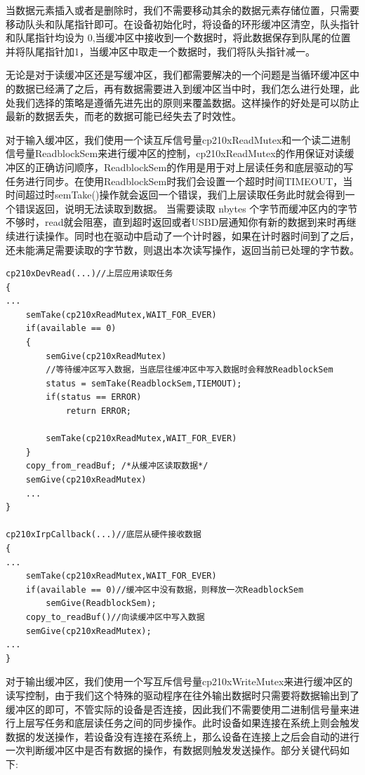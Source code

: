 	当数据元素插入或者是删除时，我们不需要移动其余的数据元素存储位置，只需要移动队头和队尾指针即可。在设备初始化时，将设备的环形缓冲区清空，队头指针和队尾指针均设为 0,当缓冲区中接收到一个数据时，将此数据保存到队尾的位置并将队尾指针加1，当缓冲区中取走一个数据时，我们将队头指针减一。

	无论是对于读缓冲区还是写缓冲区，我们都需要解决的一个问题是当循环缓冲区中的数据已经满了之后，再有数据需要进入到缓冲区当中时，我们怎么进行处理，此处我们选择的策略是遵循先进先出的原则来覆盖数据。这样操作的好处是可以防止最新的数据丢失，而老的数据可能已经失去了时效性。

	对于输入缓冲区，我们使用一个读互斥信号量cp210xReadMutex和一个读二进制信号量ReadblockSem来进行缓冲区的控制，cp210xReadMutex的作用保证对读缓冲区的正确访问顺序，ReadblockSem的作用是用于对上层读任务和底层驱动的写任务进行同步。在使用ReadblockSem时我们会设置一个超时时间TIMEOUT，当时间超过时semTake()操作就会返回一个错误，我们上层读取任务此时就会得到一个错误返回，说明无法读取到数据。
	当需要读取 nbytes 个字节而缓冲区内的字节不够时，read就会阻塞，直到超时返回或者USBD层通知你有新的数据到来时再继续进行读操作。同时也在驱动中启动了一个计时器，如果在计时器时间到了之后，还未能满足需要读取的字节数，则退出本次读写操作，返回当前已处理的字节数。

\lstset{language=C}
\begin{lstlisting}
cp210xDevRead(...)//上层应用读取任务
{
...
	semTake(cp210xReadMutex,WAIT_FOR_EVER)	
	if(available == 0)
	{
		semGive(cp210xReadMutex)
		//等待缓冲区写入数据，当底层往缓冲区中写入数据时会释放ReadblockSem
		status = semTake(ReadblockSem,TIEMOUT);
		if(status == ERROR)
			return ERROR;
			
		semTake(cp210xReadMutex,WAIT_FOR_EVER)
	}
	copy_from_readBuf; /*从缓冲区读取数据*/
	semGive(cp210xReadMutex)
	...
}

cp210xIrpCallback(...)//底层从硬件接收数据
{
...
	semTake(cp210xReadMutex,WAIT_FOR_EVER)
	if(available == 0)//缓冲区中没有数据，则释放一次ReadblockSem
		semGive(ReadblockSem);
	copy_to_readBuf()//向读缓冲区中写入数据
	semGive(cp210xReadMutex);
...
}
\end{lstlisting}  


	对于输出缓冲区，我们使用一个写互斥信号量cp210xWriteMutex来进行缓冲区的读写控制，由于我们这个特殊的驱动程序在往外输出数据时只需要将数据输出到了缓冲区的即可，不管实际的设备是否连接，因此我们不需要使用二进制信号量来进行上层写任务和底层读任务之间的同步操作。此时设备如果连接在系统上则会触发数据的发送操作，若设备没有连接在系统上，那么设备在连接上之后会自动的进行一次判断缓冲区中是否有数据的操作，有数据则触发发送操作。部分关键代码如下:

